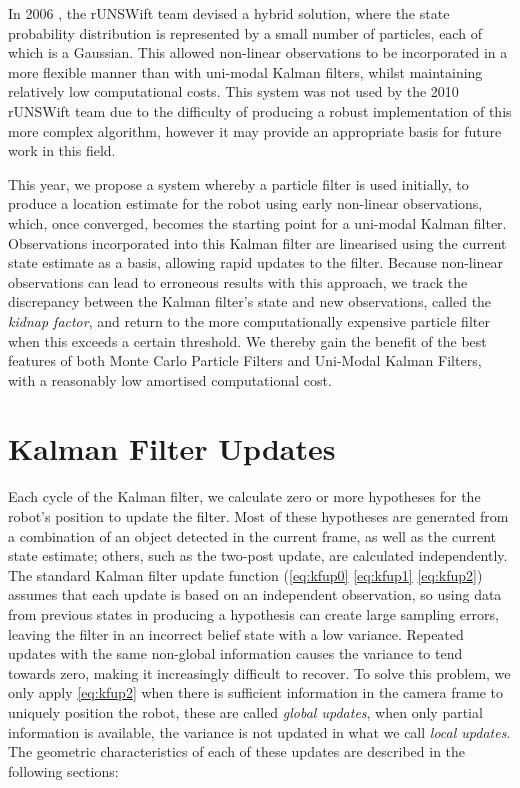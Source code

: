 \documentclass[pdftex,11pt,a4paper]{report}
\begin{document}
In 2006 \cite{olegthesis}, the rUNSWift team devised a hybrid solution, where the state probability distribution is represented by a small number of particles, each of which is a Gaussian. This allowed non-linear observations to be incorporated in a more flexible manner than with uni-modal Kalman filters, whilst maintaining relatively low computational costs. This system was not used by the 2010 rUNSWift team due to the difficulty of producing a robust implementation of this more complex algorithm, however it may provide an appropriate basis for future work in this field.

This year, we propose a system whereby a particle filter is used initially, to produce a location estimate for the robot using early non-linear observations, which, once converged, becomes the starting point for a uni-modal Kalman filter. Observations incorporated into this Kalman filter are linearised using the current state estimate as a basis, allowing rapid updates to the filter. Because non-linear observations can lead to erroneous results with this approach, we track the discrepancy between the Kalman filter's state and new observations, called the \emph{kidnap factor}, and return to the more computationally expensive particle filter when this exceeds a certain threshold. We thereby gain the benefit of the best features of both Monte Carlo Particle Filters and Uni-Modal Kalman Filters, with a reasonably low amortised computational cost.

\section{Kalman Filter Updates}

Each cycle of the Kalman filter, we calculate zero or more hypotheses for the robot's position to update the filter. Most of these hypotheses are generated from a combination of an object detected in the current frame, as well as the current state estimate; others, such as the two-post update, are calculated independently. The standard Kalman filter update function (\autoref{eq:kfup0} \ref{eq:kfup1} \ref{eq:kfup2}) assumes that each update is based on an independent observation, so using data from previous states in producing a hypothesis can create large sampling errors, leaving the filter in an incorrect belief state with a low variance. Repeated updates with the same non-global information causes the variance to tend towards zero, making it increasingly difficult to recover. To solve this problem, we only apply \autoref{eq:kfup2} when there is sufficient information in the camera frame to uniquely position the robot, these are called \emph{global updates}, when only partial information is available, the variance is not updated in what we call \emph{local updates}. The geometric characteristics of each of these updates are described in the following sections:
\end{document}
